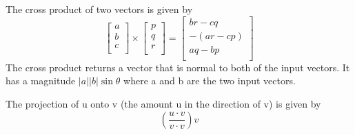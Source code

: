 \documentclass[12pt] {article}
\begin{document}
The cross product of two vectors is given by 
\begin{equation*}
  \begin{bmatrix}
    a \\
    b \\ 
    c \\
  \end{bmatrix} \times 
  \begin{bmatrix}
    p \\
    q \\ 
    r \\
  \end{bmatrix}
  =
  \begin{bmatrix}
    br-cq \\
    -(ar-cp) \\ 
    aq-bp \\
  \end{bmatrix}
\end{equation*}
The cross product returns a vector that is normal to both of the input vectors. It has a magnitude 
$|a||b|\sin\theta$ where a and b are the two input vectors.

The projection of u onto v (the amount u in the direction of v) is given by
\begin{equation*}
  (\frac{u\cdot v}{v\cdot v})v
\end{equation*}


\newpage
\end{document}
